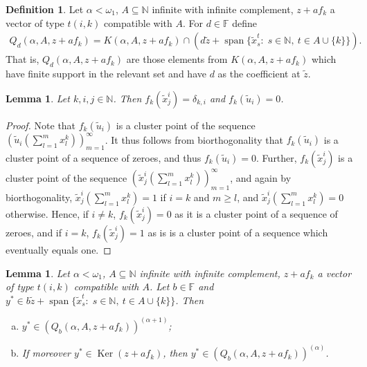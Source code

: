 \documentclass{amsart}
\newtheorem{lemma}[theorem]{Lemma}
\theoremstyle{definition}
\newtheorem*{definition}{Definition}
\begin{document}
\begin{definition}
    Let $\alpha < \omega_1$, $A \subseteq \mathbb{N}$ infinite with infinite complement, $z + a f_k$ a vector of type $t(i,k)$ compatible with $A$. For $d \in \mathbb{F}$ define
    \begin{align*}
        Q_d(\alpha,A, z + a f_k) = K(\alpha,A,z + a f_k) \cap \left( d \widetilde{z} + \operatorname{span} \{\widetilde{x}^t_s: \; s \in \mathbb{N}, \: t \in A \cup \{k\}\} \right).
    \end{align*}
    That is, $Q_d(\alpha,A, z + a f_k)$ are those elements from $K(\alpha,A,z + a f_k)$ which have finite support in the relevant set and have $d$ as the coefficient at $\widetilde{z}$.
\end{definition}

\begin{lemma} \label{Lemma:RozsBiort}
    Let $k,i,j \in \mathbb{N}$. Then $f_k(\widetilde{x}^i_j) = \delta_{k,i}$ and $f_k(\widetilde{u}_i) = 0$.
\end{lemma}

\begin{proof}
    Note that $f_k(\widetilde{u}_i)$ is a cluster point of the sequence $\left( \widetilde{u}_i \left( \sum_{l=1}^m x^k_l \right) \right)_{m=1}^\infty$. It thus follows from biorthogonality that $f_k(\widetilde{u}_i)$ is a cluster point of a sequence of zeroes, and thus $f_k(\widetilde{u}_i) = 0$. Further, $f_k(\widetilde{x}^i_j)$ is a cluster point of the sequence $\left( \widetilde{x}^i_j \left( \sum_{l=1}^m x^k_l \right) \right)_{m=1}^\infty$, and again by biorthogonality, $\widetilde{x}^i_j \left( \sum_{l=1}^m x^k_l \right) = 1$ if $i=k$ and $m \geq l$, and $\widetilde{x}^i_j \left( \sum_{l=1}^m x^k_l \right) = 0$ otherwise. Hence, if $i \neq k$, $f_k(\widetilde{x}^i_j) = 0$ as it is a cluster point of a sequence of zeroes, and if $i = k$, $f_k(\widetilde{x}^i_j) = 1$ as is is a cluster point of a sequence which eventually equals one.
\end{proof}

\begin{lemma} \label{Lemma:Dosazeni}
    Let $\alpha < \omega_1$, $A \subseteq \mathbb{N}$ infinite with infinite complement, $z + a f_k$ a vector of type $t(i,k)$ compatible with $A$. Let $b \in \mathbb{F}$ and $y^* \in b \widetilde{z} + \operatorname{span} \{\widetilde{x}^t_s: \; s \in \mathbb{N}, \: t \in A \cup \{k\}\}$. Then
    \begin{enumerate}[(a)]
        \item $y^* \in \left( Q_b(\alpha,A,z+af_k) \right)^{(\alpha+1)}$;
        \item If moreover $y^* \in \operatorname{Ker}(z + a f_k)$, then $y^* \in \left( Q_b(\alpha,A,z+af_k) \right)^{(\alpha)}$.
    \end{enumerate}
\end{lemma}
\end{document}

